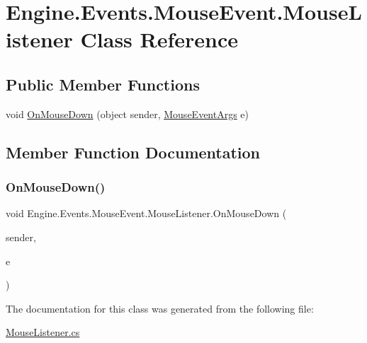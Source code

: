 \hypertarget{a00382}{}\section{Engine.\+Events.\+Mouse\+Event.\+Mouse\+Listener Class Reference}
\label{a00382}
\subsection*{Public Member Functions}
\begin{DoxyCompactItemize}
\item 
void \hyperlink{a00382_a36ca3f66e9cbbe61a645cb39c876c524}{On\+Mouse\+Down} (object sender, \hyperlink{a00374}{Mouse\+Event\+Args} e)
\end{DoxyCompactItemize}


\subsection{Member Function Documentation}
\mbox{\label{a00382_a36ca3f66e9cbbe61a645cb39c876c524}} 
\subsubsection{\texorpdfstring{On\+Mouse\+Down()}{OnMouseDown()}}
{\footnotesize\ttfamily void Engine.\+Events.\+Mouse\+Event.\+Mouse\+Listener.\+On\+Mouse\+Down (\begin{DoxyParamCaption}\item[{object}]{sender,  }\item[{\hyperlink{a00374}{Mouse\+Event\+Args}}]{e }\end{DoxyParamCaption})\hspace{0.3cm}{\ttfamily [inline]}}



The documentation for this class was generated from the following file\+:\begin{DoxyCompactItemize}
\item 
\hyperlink{a00068}{Mouse\+Listener.\+cs}\end{DoxyCompactItemize}
